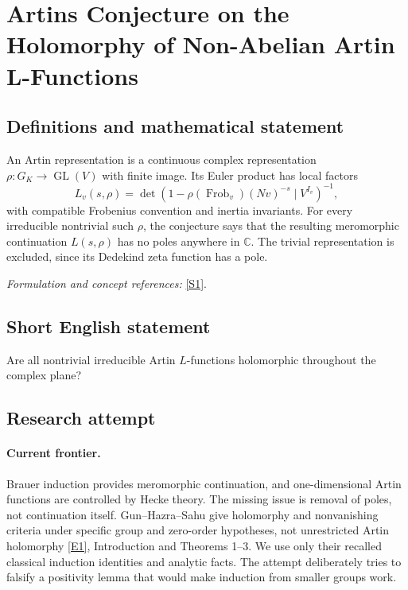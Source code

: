 \documentclass[11pt,a4paper]{article}
\newcommand{\C}{\mathbb{C}}
\newcommand{\sref}[2]{\hyperlink{source:#1:#2}{[S#2]}}
\newcommand{\eref}[2]{\hyperlink{extra:#1:#2}{[E#2]}}
\newif\ifshowcatalogue
\newcommand{\cataloguescope}[1]{\ifshowcatalogue
 \paragraph{Exact scope in the supplied catalogue.}
 \begin{quote}\small #1\end{quote}\fi}
\numberwithin{equation}{section}
\begin{document}
\setcounter{section}{0}
\clearpage
\section*{\texorpdfstring{Artins Conjecture on the Holomorphy of Non-Abelian Artin L-Functions}{Artins Conjecture on the Holomorphy of Non-Abelian Artin L-Functions}}\label{statement}
\subsection{Definitions and mathematical statement}
An Artin representation is a continuous complex representation $\rho:G_K\to\operatorname{GL}(V)$ with finite image. Its Euler product has local factors
\[
 L_v(s,\rho)=\det(1-\rho(\operatorname{Frob}_v)(Nv)^{-s}\mid V^{I_v})^{-1},
\]
with compatible Frobenius convention and inertia invariants. For every irreducible nontrivial such $\rho$, the conjecture says that the resulting meromorphic continuation $L(s,\rho)$ has no poles anywhere in $\C$. The trivial representation is excluded, since its Dedekind zeta function has a pole.
\par\smallskip\textit{Formulation and concept references:} \sref{statement}{1}.
\cataloguescope{Prove that every non-trivial irreducible Artin L-function L(s, rho) associated to a Galois representation rho is an entire holomorphic function on the whole complex plane.}
\subsection{Short English statement}
Are all nontrivial irreducible Artin $L$-functions holomorphic throughout the complex plane?
\subsection{Research attempt}

\paragraph{Current frontier.}
Brauer induction provides meromorphic continuation, and one-dimensional Artin functions are controlled by Hecke theory. The missing issue is removal of poles, not continuation itself. Gun--Hazra--Sahu give holomorphy and nonvanishing criteria under specific group and zero-order hypotheses, not unrestricted Artin holomorphy \eref{statement}{1}, Introduction and Theorems 1--3. We use only their recalled classical induction identities and analytic facts. The attempt deliberately tries to falsify a positivity lemma that would make induction from smaller groups work.
\end{document}
